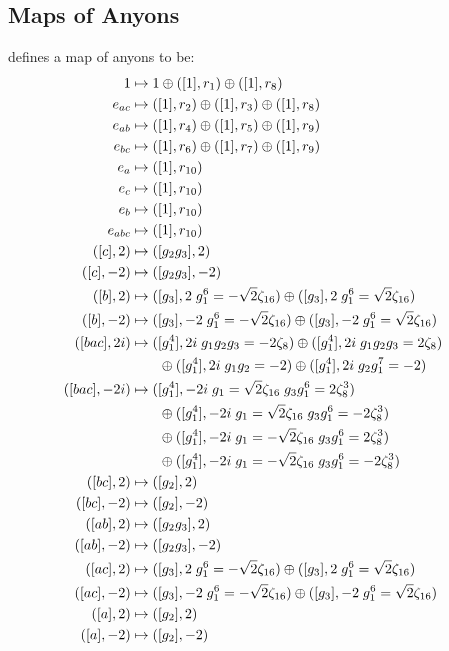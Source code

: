 \documentclass[aps,twocolumn,prx,floatfix,preprintnumbers, nofootinbib,10pt]{revtex4-2}
\numberwithin{equation}{section}
\theoremstyle{definition}
\begin{document}
\subsection{Maps of Anyons}
\label{app:map-of-anyon-G32omega}
 defines a map of anyons to be:
\begin{align}
    1 &\mapsto 1 \oplus ([1],r_1) \oplus ([1],r_8) \cr 
e_{ac} &\mapsto ([1],r_2) \oplus ([1],r_3) \oplus ([1],r_8) \cr 
e_{ab} &\mapsto ([1],r_4) \oplus ([1],r_5) \oplus ([1],r_9) \cr 
e_{bc} &\mapsto ([1],r_6) \oplus ([1],r_7) \oplus ([1],r_9) \cr 
e_{a} &\mapsto ([1],r_{10}) \cr 
e_{c} &\mapsto ([1],r_{10}) \cr 
e_{b} &\mapsto ([1],r_{10}) \cr 
e_{abc} &\mapsto ([1],r_{10}) \cr 
([c],2) &\mapsto ([g_2g_3],2) \cr 
([c],-2) &\mapsto ([g_2g_3],-2) \cr 
([b],2) &\mapsto ([g_3],2\;g_1^6=-\sqrt{2}\zeta_{16}) \oplus ([g_3],2\;g_1^6=\sqrt{2}\zeta_{16}) \cr 
([b],-2) &\mapsto ([g_3],-2\;g_1^6=-\sqrt{2}\zeta_{16}) \oplus ([g_3],-2\;g_1^6=\sqrt{2}\zeta_{16}) \cr 
([bac],2i) &\mapsto ([g_1^4],2i\;g_1g_2g_3=-2\zeta_8) \oplus ([g_1^4],2i\;g_1g_2g_3=2\zeta_8) \cr
& \qquad \oplus ([g_1^4],2i\;g_1g_2=-2) \oplus ([g_1^4],2i\;g_2g_1^7=-2) \cr 
([bac],-2i) &\mapsto ([g_1^4],-2i\;g_1=\sqrt{2}\zeta_{16}\;g_3g_1^6=2\zeta_8^3) \cr
& \qquad \oplus ([g_1^4],-2i\;g_1=\sqrt{2}\zeta_{16}\;g_3g_1^6=-2\zeta_8^3) \cr
&\qquad\oplus ([g_1^4],-2i\;g_1=-\sqrt{2}\zeta_{16}\;g_3g_1^6=2\zeta_8^3) \cr
& \qquad \oplus ([g_1^4],-2i\;g_1=-\sqrt{2}\zeta_{16}\;g_3g_1^6=-2\zeta_8^3) \cr 
([bc],2) &\mapsto ([g_2],2) \cr 
([bc],-2) &\mapsto ([g_2],-2) \cr 
([ab],2) &\mapsto ([g_2g_3],2) \cr 
([ab],-2) &\mapsto ([g_2g_3],-2) \cr 
([ac],2) &\mapsto ([g_3],2\;g_1^6=-\sqrt{2}\zeta_{16}) \oplus ([g_3],2\;g_1^6=\sqrt{2}\zeta_{16}) \cr 
([ac],-2) &\mapsto ([g_3],-2\;g_1^6=-\sqrt{2}\zeta_{16}) \oplus ([g_3],-2\;g_1^6=\sqrt{2}\zeta_{16}) \cr 
([a],2) &\mapsto ([g_2],2) \cr 
([a],-2) &\mapsto ([g_2],-2) \cr
\end{align}


\clearpage
\clearpage
\onecolumngrid
\end{document}
